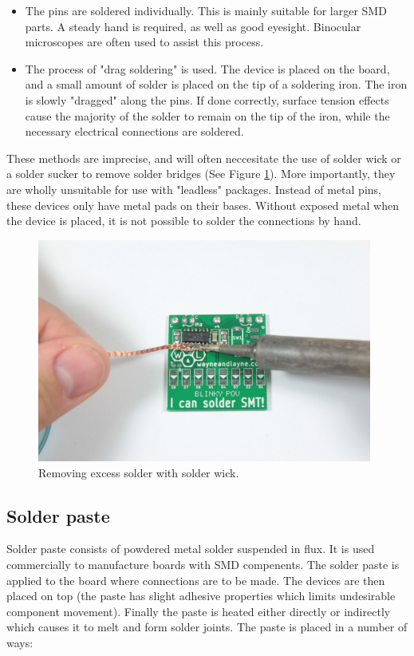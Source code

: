 \documentclass[a4paper,11pt]{article}  %
\begin{document}
\begin{itemize}
	\item	The pins are soldered individually. This is mainly suitable for larger SMD parts. A steady hand is required, as well as good eyesight.
			Binocular microscopes are often used to assist this process.
			
	\item	The process of "drag soldering" is used. The device is placed on the board, and a small amount of solder is placed on the tip of a soldering iron.
			The iron is slowly "dragged" along the pins. If done correctly, surface tension effects cause the majority of the solder to remain on the tip of the iron,
			while the necessary electrical connections are soldered.
\end{itemize}

These methods are imprecise, and will often neccesitate the use of solder wick or a solder sucker to remove solder bridges (See Figure \ref{handsolder}). More importantly, they are wholly unsuitable
for use with "leadless" packages. Instead of metal pins, these devices only have metal pads on their bases. Without exposed metal when the device is placed, it is not possible
to solder the connections by hand.

\begin{figure}[ht!]
\centering
\includegraphics[width=110mm]{resources/handsoldering.jpg}
\caption{Removing excess solder with solder wick.}
\label{handsolder}
\end{figure}

\subsection{Solder paste}

Solder paste consists of powdered metal solder suspended in flux. It is used commercially to manufacture boards with SMD compenents. The solder paste is applied to the board where
connections are to be made. The devices are then placed on top (the paste has slight adhesive properties which limits undesirable component movement). Finally the paste is heated either directly
or indirectly which causes it to melt and form solder joints. The paste is placed in a number of ways:
\end{document}
